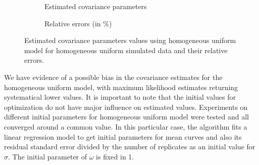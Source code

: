 \begin{figure}[t]
  \begin{subfigure}{\textwidth}
  \centering
\begin{knitrout}
\color{fgcolor}\begin{kframe}


{\ttfamily\noindent\bfseries{}}

{\ttfamily\noindent\bfseries{}}

{\ttfamily\noindent\bfseries\color{errorcolor}{\#\# Error in lapply(list(hu2hu5, hu2hu30), function(x) x\$cov\_par): object 'hu2hu5' not found}}

{\ttfamily\noindent\bfseries{}}

{\ttfamily\noindent\bfseries\color{errorcolor}{\#\# Error in eval(lhs, parent, parent): object 'cp' not found}}\end{kframe}
\end{knitrout}
    \caption{Estimated covariance parameters} \label{fig:cpest-hu2hu}
  \end{subfigure}
  \begin{subfigure}{\textwidth}
  \centering
\begin{knitrout}
\color{fgcolor}\begin{kframe}


{\ttfamily\noindent\bfseries\color{errorcolor}{\#\# Error in eval(lhs, parent, parent): object 'cp' not found}}\end{kframe}
\end{knitrout}
    \caption{Relative errors (in \%) }\label{fig:re-hu2hu}
  \end{subfigure}
  \caption{Estimated covariance parameters values using homogeneous uniform model for homogeneous uniform simulated data and their relative errors.}
  \label{fig:cp-hu2hu}
\end{figure}

We have evidence of a possible bias in the covariance estimates for the homogeneous uniform model, with maximum likelihood estimates returning systematical lower values. It is important to note that the initial values for optimization do not have major influence on estimated values. Experiments on different initial parameters for homogeneous uniform model were tested and all converged around a common value. In this particular case, the algorithm fits a linear regression model to get initial parameters for mean curves and also its residual standard error divided by the number of replicates as an initial value for $\sigma$. The initial parameter of $\omega$ is fixed in 1.


